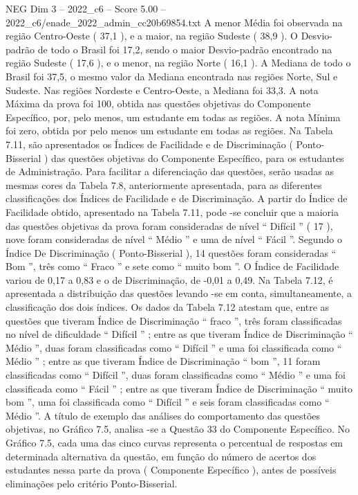 \begin{textsample}{NEG Dim 3 – 2022\_c6 – Score 5.00 – 2022\_c6/enade\_2022\_admin\_cc20b69854.txt}
A menor Média foi observada na região Centro-Oeste ( 37,1 ), e a maior, na região Sudeste ( 38,9 ).
O Desvio-padrão de todo o Brasil foi 17,2, sendo o maior Desvio-padrão encontrado na região Sudeste ( 17,6 ), e o menor, na região Norte ( 16,1 ).
A Mediana de todo o Brasil foi 37,5, o mesmo valor da Mediana encontrada nas regiões Norte, Sul e Sudeste.
Nas regiões Nordeste e Centro-Oeste, a Mediana foi 33,3.
A nota Máxima da prova foi 100, obtida nas questões objetivas do Componente Específico, por, pelo menos, um estudante em todas as regiões.
A nota Mínima foi zero, obtida por pelo menos um estudante em todas as regiões.
Na Tabela 7.11, são apresentados os Índices de Facilidade e de Discriminação ( Ponto-Bisserial ) das questões objetivas do Componente Específico, para os estudantes de Administração.
Para facilitar a diferenciação das questões, serão usadas as mesmas cores da Tabela 7.8, anteriormente apresentada, para as diferentes classificações dos Índices de Facilidade e de Discriminação.
A partir do Índice de Facilidade obtido, apresentado na Tabela 7.11, pode -se concluir que a maioria das questões objetivas da prova foram consideradas de nível “ Difícil ” ( 17 ), nove foram consideradas de nível “ Médio ” e uma de nível “ Fácil ”.
Segundo o Índice De Discriminação ( Ponto-Bisserial ), 14 questões foram consideradas “ Bom ”, três como “ Fraco ” e sete como “ muito bom ”.
O Índice de Facilidade variou de 0,17 a 0,83 e o de Discriminação, de -0,01 a 0,49.
Na Tabela 7.12, é apresentada a distribuição das questões levando -se em conta, simultaneamente, a classificação dos dois índices.
Os dados da Tabela 7.12 atestam que, entre as questões que tiveram Índice de Discriminação “ fraco ”, três foram classificadas no nível de dificuldade “ Difícil ” ; entre as que tiveram Índice de Discriminação “ Médio ”, duas foram classificadas como “ Difícil ” e uma foi classificada como “ Médio ” ; entre as que tiveram Índice de Discriminação “ bom ”, 11 foram classificadas como “ Difícil ”, duas foram classificadas como “ Médio ” e uma foi classificada como “ Fácil ” ; entre as que tiveram Índice de Discriminação “ muito bom ”, uma foi classificada como “ Difícil ” e seis foram classificadas como “ Médio ”.
A título de exemplo das análises do comportamento das questões objetivas, no Gráfico 7.5, analisa -se a Questão 33 do Componente Específico.
No Gráfico 7.5, cada uma das cinco curvas representa o percentual de respostas em determinada alternativa da questão, em função do número de acertos dos estudantes nessa parte da prova ( Componente Específico ), antes de possíveis eliminações pelo critério Ponto-Bisserial.

\end{textsample}

